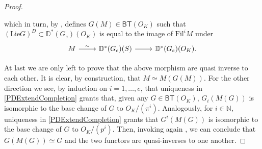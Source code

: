 \begin{proof}
\begin{enumerate}
	which in turn, by \cite[Lemma 2.4.4]{deJong}, defines $G(M) \in \mathsf{BT}(O_K)$
	such that $(\mathrm{Lie}G)^D \subset \mathbb{D}^*(G_e)(O_K)$ is
	equal to the image of $\mathrm{Fil}^iM$ under
	\begin{equation*}
	\begin{tikzcd}
		M \arrow[r, "\sim", rightarrow] &
		\mathbb{D}^*(G_e)(S) \arrow[r, "", rightarrow] &
		\mathbb{D}^*(G_e)(O_K)
	.\end{tikzcd}
	\end{equation*}
\end{enumerate}
At last we are only left to prove that the above morphism are quasi inverse to each other.
It is clear, by construction, that $M \simeq M(G(M))$.
For the other direction we see, by induction on $i = 1, \ldots, e$, that uniqueness in
\cref{PDExtendCompletion} grants that, given any $G \in \mathsf{BT}(O_K)$, $G_i(M(G))$ is
isomorphic to the base change of $G$ to $O_K/ (\pi^i)$.
Analogously, for $i \in \mathbb{N}$, uniqueness in \cref{PDExtendCompletion} grants
that $G^i(M(G))$ is isomorphic to the base change of $G$ to $O_K/ (p^i)$.
Then, invoking again \cite[Lemma 2.4.4]{deJong}, we can conclude that $G(M(G)) \simeq G$
and the two functors are quasi-inverses to one another.
\end{proof}
